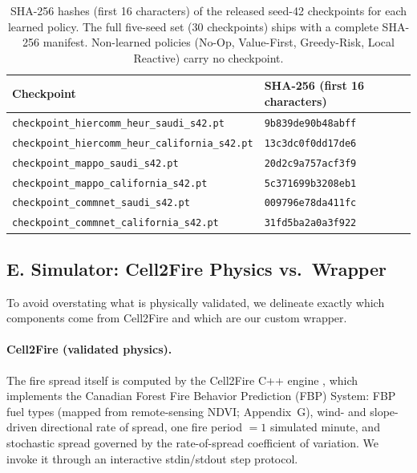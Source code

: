 \documentclass[letterpaper]{article}
\begin{document}
\begin{table}[h]
\centering
\caption{SHA-256 hashes (first 16 characters) of the released seed-42 checkpoints for each learned policy. The full five-seed set (30 checkpoints) ships with a complete SHA-256 manifest. Non-learned policies (No-Op, Value-First, Greedy-Risk, Local Reactive) carry no checkpoint.}
\label{tab:hashes}
\begin{tabular}{ll}
\toprule
Checkpoint & SHA-256 (first 16 characters) \\
\midrule
\texttt{checkpoint\_hiercomm\_heur\_saudi\_s42.pt} & \texttt{9b839de90b48abff} \\
\texttt{checkpoint\_hiercomm\_heur\_california\_s42.pt} & \texttt{13c3dc0f0dd17de6} \\
\texttt{checkpoint\_mappo\_saudi\_s42.pt} & \texttt{20d2c9a757acf3f9} \\
\texttt{checkpoint\_mappo\_california\_s42.pt} & \texttt{5c371699b3208eb1} \\
\texttt{checkpoint\_commnet\_saudi\_s42.pt} & \texttt{009796e78da411fc} \\
\texttt{checkpoint\_commnet\_california\_s42.pt} & \texttt{31fd5ba2a0a3f922} \\
\bottomrule
\end{tabular}
\end{table}

\subsection*{E. Simulator: Cell2Fire Physics vs.\ Wrapper}

To avoid overstating what is physically validated, we delineate exactly which components come from Cell2Fire and which are our custom wrapper.

\paragraph{Cell2Fire (validated physics).} The fire spread itself is computed by the Cell2Fire C++ engine \citep{pais2021cell2fire}, which implements the Canadian Forest Fire Behavior Prediction (FBP) System: FBP fuel types (mapped from remote-sensing NDVI; Appendix~G), wind- and slope-driven directional rate of spread, one fire period $=1$ simulated minute, and stochastic spread governed by the rate-of-spread coefficient of variation. We invoke it through an interactive stdin/stdout step protocol.
\end{document}
